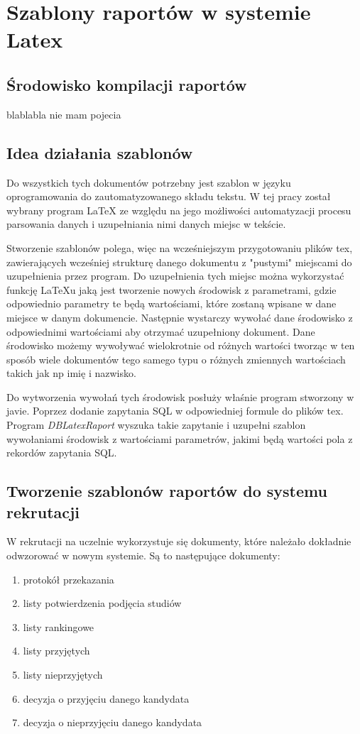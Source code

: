 \chapter{Szablony raportów w systemie Latex}
\label{ch:szablonyraportowwsystemielatex}
\section{Środowisko kompilacji raportów}

blablabla nie mam pojecia

\section{Idea działania szablonów}

Do wszystkich tych dokumentów potrzebny jest szablon w języku oprogramowania do zautomatyzowanego składu tekstu. W tej pracy został wybrany program LaTeX ze względu na jego możliwości automatyzacji procesu parsowania danych i uzupełniania nimi danych miejsc w tekście.
\par Stworzenie szablonów polega, więc na wcześniejszym przygotowaniu plików tex, zawierających wcześniej strukturę danego dokumentu z "pustymi" miejscami do uzupełnienia przez program. Do uzupełnienia tych miejsc można wykorzystać funkcję LaTeXu jaką jest tworzenie nowych środowisk z parametrami, gdzie odpowiednio parametry te będą wartościami, które zostaną wpisane w dane miejsce w danym dokumencie. Następnie wystarczy wywołać dane środowisko z odpowiednimi wartościami aby otrzymać uzupełniony dokument. Dane środowisko możemy wywoływać wielokrotnie od różnych wartości tworząc w ten sposób wiele dokumentów tego samego typu o różnych zmiennych wartościach takich jak np imię i nazwisko. 
\par Do wytworzenia wywołań tych środowisk posłuży właśnie program stworzony w javie. Poprzez dodanie zapytania SQL w odpowiedniej formule do plików tex. Program \emph{DBLatexRaport} wyszuka takie zapytanie i uzupełni szablon wywołaniami środowisk z wartościami parametrów, jakimi będą wartości pola z rekordów zapytania SQL. 




\section{Tworzenie szablonów raportów do systemu rekrutacji}

W rekrutacji na uczelnie wykorzystuje się dokumenty, które należało dokładnie odwzorować w nowym systemie. Są to następujące dokumenty:\\
\begin{enumerate}
\item protokół przekazania
\item listy potwierdzenia podjęcia studiów 
\item listy rankingowe 
\item listy przyjętych
\item listy nieprzyjętych
\item decyzja o przyjęciu danego kandydata
\item decyzja o nieprzyjęciu danego kandydata \\
\end{enumerate}

